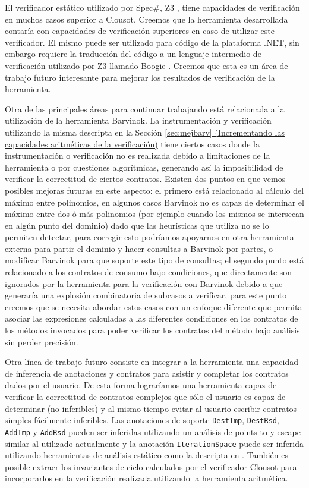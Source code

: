 \documentclass[12pt,a4paper]{article}
\newcommand\mono[1]{\texttt{#1}}
\begin{document}
		El verificador estático utilizado por Spec\#, Z3 \cite{Z3}, tiene capacidades de verificación en muchos casos superior a Clousot. Creemos que la herramienta desarrollada contaría con capacidades de verificación superiores en caso de utilizar este verificador. El mismo puede ser utilizado para código de la plataforma .NET, sin embargo requiere la traducción del código a un lenguaje intermedio de verificación utilizado por Z3 llamado Boogie \cite{Boogie}. Creemos que esta es un área de trabajo futuro interesante para mejorar los resultados de verificación de la herramienta.

		Otra de las principales áreas para continuar trabajando está relacionada a la utilización de la herramienta Barvinok. La instrumentación y verificación utilizando la misma descripta en la Sección \hyperref[sec:mejbarv]{\ref*{sec:mejbarv} (Incrementando las capacidades aritméticas de la verificación)} tiene ciertos casos donde la instrumentación o verificación no es realizada debido a limitaciones de la herramienta o por cuestiones algorítmicas, generando así la imposibilidad de verificar la correctitud de ciertos contratos. Existen dos puntos en que vemos posibles mejoras futuras en este aspecto: el primero está relacionado al cálculo del máximo entre polinomios, en algunos casos Barvinok no es capaz de determinar el máximo entre dos ó más polinomios (por ejemplo cuando los mismos se intersecan en algún punto del dominio) dado que las heurísticas que utiliza no se lo permiten detectar, para corregir esto podríamos apoyarnos en otra herramienta externa para partir el dominio y hacer consultas a Barvinok por partes, o modificar Barvinok para que soporte este tipo de consultas; el segundo punto está relacionado a los contratos de consumo bajo condiciones, que directamente son ignorados por la herramienta para la verificación con Barvinok debido a que generaría una explosión combinatoria de subcasos a verificar, para este punto creemos que se necesita abordar estos casos con un enfoque diferente que permita asociar las expresiones calculadas a las diferentes condiciones en los contratos de los métodos invocados para poder verificar los contratos del método bajo análisis sin perder precisión.

		Otra línea de trabajo futuro consiste en integrar a la herramienta una capacidad de inferencia de anotaciones y contratos para asistir y completar los contratos dados por el usuario. De esta forma lograríamos una herramienta capaz de verificar la correctitud de contratos complejos que sólo el usuario es capaz de determinar (no inferibles) y al mismo tiempo evitar al usuario escribir contratos simples fácilmente inferibles. Las anotaciones de soporte \mono{DestTmp}, \mono{DestRsd}, \mono{AddTmp} y \mono{AddRsd} pueden ser inferidas utilizando un análisis de points-to y escape similar al utilizado actualmente y la anotación \mono{IterationSpace} puede ser inferida utilizando herramientas de análisis estático como la descripta en \cite{daikon}. También es posible extraer los invariantes de ciclo calculados por el verificador Clousot para incorporarlos en la verificación realizada utilizando la herramienta aritmética.
\end{document}
